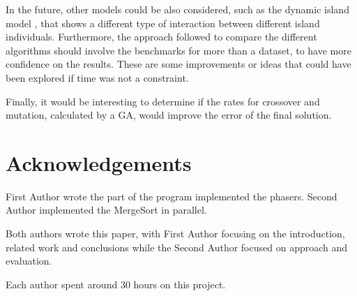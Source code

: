 \documentclass[runningheads]{llncs}
\begin{document}
In the future, other models could be also considered, such as the dynamic island model \cite{meng2017dynamic}, that shows a different type of interaction between different island individuals. Furthermore, the approach followed to compare the different algorithms should involve the benchmarks for more than a dataset, to have more confidence on the results. These are some improvements or ideas that could have been explored if time was not a constraint.

Finally, it would be interesting to determine if the rates for crossover and mutation, calculated by a GA, would  improve the error of the final solution.

\section*{Acknowledgements}

First Author wrote the part of the program implemented the phasers. Second Author implemented the MergeSort in parallel. 

Both authors wrote this paper, with First Author focusing on the introduction, related work and conclusions while the Second Author focused on approach and evaluation.

Each author spent around 30 hours on this project.



\end{document}
